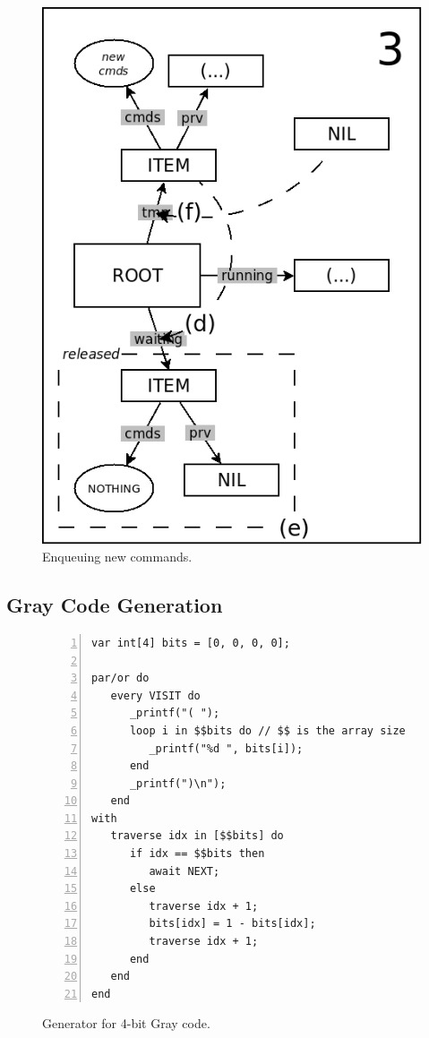 \documentclass{sig-alternate}
\begin{document}
\begin{figure}
\begin{minipage}[t]{0.24\linewidth}
\includegraphics[scale=0.25]{queue-23.png}
\end{minipage}
\caption{
Enqueuing new commands.
\label{fig.queue-2}
}
\end{figure}

\subsection{Gray Code Generation}

\begin{figure}%
\begin{lstlisting}[numbers=left,xleftmargin=3em]
var int[4] bits = [0, 0, 0, 0];

par/or do
   every VISIT do
      _printf("( ");
      loop i in $$bits do // $$ is the array size
         _printf("%d ", bits[i]);
      end
      _printf(")\n");
   end
with
   traverse idx in [$$bits] do
      if idx == $$bits then
         await NEXT;
      else
         traverse idx + 1;
         bits[idx] = 1 - bits[idx];
         traverse idx + 1;
      end
   end
end
\end{lstlisting}
\caption{ Generator for 4-bit Gray code.
\label{lst.gray}
}
\end{figure}
\end{document}
